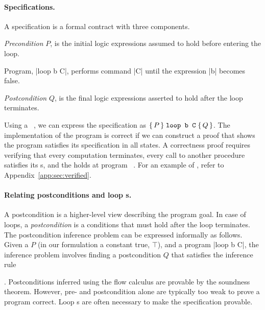 \paragraph*{Specifications.}
A {specification} is a formal contract with three
components.
\begin{enumerate*}
    \item \emph{Precondition} \(P\), is the initial logic
    expressions assumed to hold before entering the loop.
    \item Program, \pr|loop b C|, performs command \pr|C| until the expression
    \pr|b| becomes false.
    \item \emph{Postcondition} \(Q\), is the final logic
    expressions asserted to hold after the loop terminates.
\end{enumerate*}

Using a ~\cite{hoare1969}, we can express the specification as
\(\Hoare{P}{\prm{loop b C}}{Q}\). The implementation of the program is correct
if we can construct a proof that shows the program satisfies its specification
in all states. A correctness proof requires verifying that every computation
terminates, every call to another procedure satisfies its
s, and the  holds at program
~\cite{furia2010}. For an example of ,
refer to Appendix~\ref{app:sec:verified}.

\paragraph*{Relating postconditions and loop s.}
A postcondition is a higher-level view describing the program goal.
In case of loops, a \emph{postcondition} is a conditions that must hold after the loop terminates.
The postcondition inference problem can be expressed informally as follows.
Given a  \(P\) (in our formulation a constant true, \(\top\)), and a program \pr|loop b C|,
the inference problem involves finding a postcondition \(Q\) that satisfies the inference rule
\begin{prooftree} %
\end{prooftree}.
Postconditions inferred using the flow calculus are provable by the soundness theorem.
However, pre- and postcondition alone are typically too weak to prove a program correct.
Loop s are often necessary to make the specification provable.

